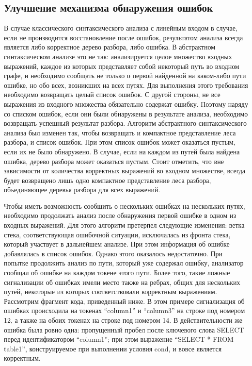 \subsection{Улучшение механизма обнаружения ошибок}
В случае классического синтаксического анализа с линейным входом в случае, если 
не производится восстановление после ошибок, результатом анализа всегда является 
либо корректное дерево разбора, либо ошибка. В абстрактном синтаксическом анализе 
это не так: анализируется целое множество входных выражений, каждое из которых 
представляет собой некоторый путь во входном графе, и необходимо сообщать не только 
о первой найденной на каком-либо пути ошибке, но обо всех, возникших на всех путях. 
Для выполнения этого требования необходимо возвращать целый список ошибок. С другой 
стороны, не все выражения из входного множества обязательно содержат ошибку. 
Поэтому наряду со списком ошибок, если они были обнаружены в результате анализа, 
необходимо возвращать успешный результат разбора. Алгоритм абстрактного синтаксического 
анализа был изменен так, чтобы возвращать и компактное представление леса разбора, 
и список ошибок. При этом список ошибок может оказаться пустым, если их не было 
обнаружено. В случае, если на каждом из путей была найдена ошибка, дерево разбора 
может оказаться пустым. Стоит отметить, что вне зависимости от количества корректных 
выражений во входном множестве, всегда будет возвращено лишь одно компактное 
представление леса разбора, объединяющее деревья разбора для всех выражений.

Чтобы иметь возможность сообщить о нескольких ошибках на нескольких путях, 
необходимо продолжать анализ после обнаружения первой ошибке в одном из входных 
выражений. Для этого алгоритм претерпел следующие изменения: ветка стека, 
соответствующая ошибочной ситуации, исключалась из фронта стека, который участвует 
в дальнейшем анализе. При этом информация об ошибке добавлялась в список ошибок. 
Однако этого оказалось недостаточно. При попытке продолжить анализ по пути, 
который уже содержал ошибку, анализатор сообщал об ошибке на каждом токене этого 
пути. Более того, такие ложные сигнализации об ошибках имели место также на ребрах, 
общих для нескольких путей, некоторые из которых соответствовали корректным 
выражениям. Рассмотрим фрагмент кода, приведенный ниже. В этом примере сигнализация
об ошибках происходила на токенах “column1” 
и “column3” на строке под номером 12, а также на обоих токенах на строке под 
номером 14. В действительности же ошибка была ровно одна: пропущенный пробел после 
ключевого слова SELECT перед идентификатором “column1”; при этом выражение “SELECT 
* FROM table1”, конструируемое при выполнении условия cond, и вовсе является 
корректным.

